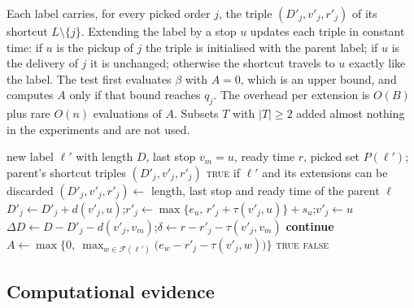 \documentclass[11pt]{article}
\theoremstyle{definition}
\theoremstyle{remark}
\newcommand{\thl}{\underline{\theta}}
\begin{document}
Each label carries, for every picked order $j$, the triple $(D'_j,v'_j,r'_j)$
of its shortcut $L\setminus\{j\}$. Extending the label by a stop $u$ updates each
triple in constant time: if $u$ is the pickup of $j$ the triple is initialised
with the parent label; if $u$ is the delivery of $j$ it is unchanged; otherwise
the shortcut travels to $u$ exactly like the label. The test first evaluates
$\beta$ with $A=0$, which is an upper bound, and computes $A$ only if that bound
reaches $q_j$. The overhead per extension is $O(B)$ plus rare $O(n)$ evaluations
of $A$. Subsets $T$ with $|T|\ge2$ added almost nothing in the experiments and
are not used.

\begin{algorithm}[!htbp]
\caption{\textsc{RuleFires}$(\ell')$: label rule after extending $\ell$ by stop $u$ (Layer 3)}
\label{alg:labelrule}
\begin{algorithmic}[1]
\Require new label $\ell'$ with length $D$, last stop $v_m=u$, ready time $r$, picked set $P(\ell')$; parent's shortcut triples $(D'_j,v'_j,r'_j)$
\Ensure \textsc{true} if $\ell'$ and its extensions can be discarded
 
   \State $(D'_j,v'_j,r'_j)\gets$ length, last stop and ready time of the parent $\ell$
    \State $D'_j\gets D'_j+d(v'_j,u)$;\quad $r'_j\gets\max\{e_u,\,r'_j+\tau(v'_j,u)\}+s_u$;\quad $v'_j\gets u$
  \EndIf {}
\EndFor
{} 
  \State $\Delta D\gets D-D'_j-d(v'_j,v_m)$;\quad $\delta\gets r-r'_j-\tau(v'_j,v_m)$
  \If{$\kappa\,\Delta D+\thl\max\{0,\delta\}/60<q_j$} \textbf{continue} 
  \EndIf
  \State $A\gets\max\bigl\{0,\ \max_{w\in\mathcal F(\ell')}\bigl(e_w-r'_j-\tau(v'_j,w)\bigr)\bigr\}$
  \If{$\kappa\,\Delta D+\thl\max\{0,\delta-A\}/60\ge q_j$} \Return \textsc{true} \EndIf
\EndFor
\State \Return \textsc{false}
\end{algorithmic}
\end{algorithm}

\subsection{Computational evidence}
\label{sec:evidence}
\end{document}

